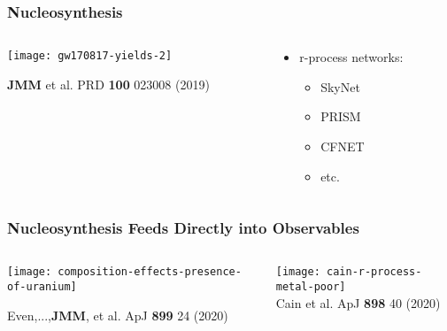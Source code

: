 \documentclass[]{beamer}
\begin{document}
\begin{frame}
  \frametitle{Nucleosynthesis}
  \begin{columns}
    \begin{column}{9cm}
      \begin{center}
        \texttt{[image: gw170817-yields-2]}
      \end{center}
      \begin{tiny}
        \textbf{JMM} et al. PRD \textbf{100} 023008 (2019)
      \end{tiny}
    \end{column}
    \begin{column}{3cm}
      \begin{itemize}
      \item r-process networks:
        \begin{itemize}
        \item SkyNet
        \item PRISM
        \item CFNET
        \item etc.
        \end{itemize}
      \end{itemize}
    \end{column}
  \end{columns}
\end{frame}

\begin{frame}
  \frametitle{Nucleosynthesis Feeds Directly into Observables}
  \begin{columns}
    \begin{column}{5cm}
      \begin{center}
        \texttt{[image: composition-effects-presence-of-uranium]}
      \end{center}
      {\tiny Even,...,\textbf{JMM}, et al. ApJ \textbf{899} 24 (2020)}
    \end{column}
    \begin{column}{7cm}
      \begin{center}
        \texttt{[image: cain-r-process-metal-poor]}\\
        {\tiny Cain et al. ApJ \textbf{898} 40 (2020)}
      \end{center}
    \end{column}
  \end{columns}
\end{frame}
\end{document}
